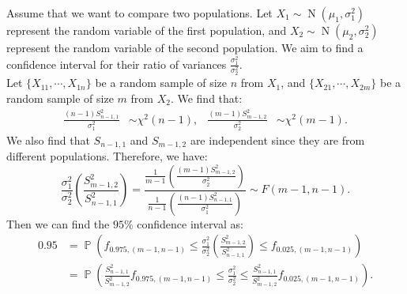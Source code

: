 \documentclass{huhtakm-template-book-v2}
\DeclareMathOperator{\prob}{\mathbb{P}}
\DeclareMathOperator{\N}{N}
\begin{document}
    \begin{eg}
        Assume that we want to compare two populations. Let $X_{1} \sim \N(\mu_{1}, \sigma_{1}^{2})$ represent the random variable of the first population, and $X_{2} \sim \N(\mu_{2}, \sigma_{2}^{2})$ represent the random variable of the second population. We aim to find a confidence interval for their ratio of variances $\frac{\sigma_{1}^{2}}{\sigma_{2}^{2}}$.\\
        Let $\{X_{11}, \cdots, X_{1n}\}$ be a random sample of size $n$ from $X_{1}$, and $\{X_{21}, \cdots, X_{2m}\}$ be a random sample of size $m$ from $X_{2}$. We find that:
        \begin{align*}
            \frac{(n - 1) S_{n-1,1}^{2}}{\sigma_{1}^{2}} &\sim \chi^{2}(n - 1), & \frac{(m - 1) S_{m-1,2}^{2}}{\sigma_{2}^{2}} &\sim \chi^{2}(m - 1).
        \end{align*}
        We also find that $S_{n-1,1}$ and $S_{m-1,2}$ are independent since they are from different populations. Therefore, we have:
        \begin{equation*}
            \frac{\sigma_{1}^{2}}{\sigma_{2}^{2}} \left(\frac{S_{m-1,2}^{2}}{S_{n-1,1}^{2}}\right) = \frac{\frac{1}{m - 1} \left(\frac{(m - 1) S_{m-1,2}^{2}}{\sigma_{2}^{2}}\right)}{\frac{1}{n - 1} \left(\frac{(n - 1) S_{n-1,1}^{2}}{\sigma_{1}^{2}}\right)} \sim F(m - 1, n - 1).
        \end{equation*}
        Then we can find the $95\%$ confidence interval as:
        \begin{align*}
            0.95 &= \prob\left(f_{0.975, (m - 1, n - 1)} \leq \frac{\sigma_{1}^{2}}{\sigma_{2}^{2}} \left(\frac{S_{m-1,2}^{2}}{S_{n-1,1}^{2}}\right) \leq f_{0.025, (m - 1, n - 1)}\right)\\
            &= \prob\left(\frac{S_{n-1,1}^{2}}{S_{m-1,2}^{2}} f_{0.975, (m - 1, n - 1)} \leq \frac{\sigma_{1}^{2}}{\sigma_{2}^{2}} \leq \frac{S_{n-1,1}^{2}}{S_{m-1,2}^{2}} f_{0.025, (m - 1, n - 1)}\right).
        \end{align*}
    \end{eg}
\end{document}

